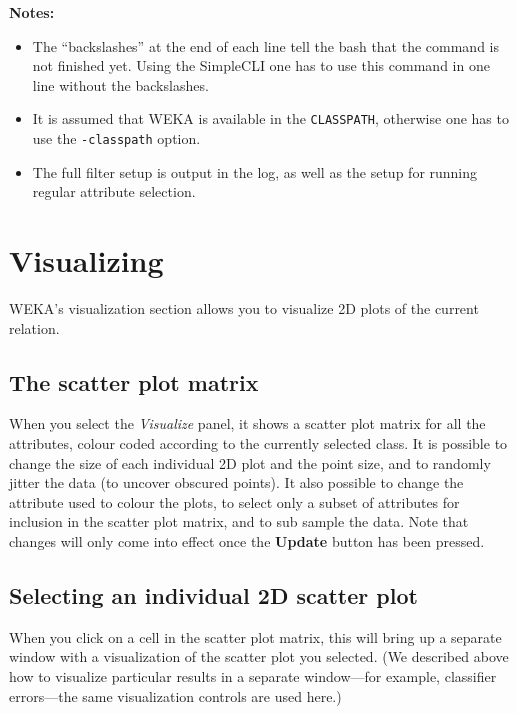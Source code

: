 \documentclass[a4paper]{article}
\begin{document}
\noindent \textbf{Notes:}
\begin{itemize}
	\item The ``backslashes'' at the end of each line tell the bash that 
	the command is not finished yet. Using the SimpleCLI one has to  
	use this command in one line without the backslashes.
	
	\item It is assumed that WEKA is available in the \texttt{CLASSPATH}, 
	otherwise one has to use the \texttt{-classpath} option.
	
	\item The full filter setup is output in the log, as well as
	the setup for running regular attribute selection.
\end{itemize}

\newpage

\section{Visualizing}

\begin{center}
\end{center}

WEKA's visualization section allows you to visualize 2D plots of the
current relation.  

\subsection{The scatter plot matrix}

When you select the {\em Visualize} panel, it shows a scatter plot
matrix for all the attributes, colour coded according to the currently
selected class. It is possible to change the size of each individual
2D plot and the point size, and to randomly jitter the data (to
uncover obscured points). It also possible to change the attribute
used to colour the plots, to select only a subset of attributes for
inclusion in the scatter plot matrix, and to sub sample the data. Note
that changes will only come into effect once the \textbf{Update}
button has been pressed.

\subsection{Selecting an individual 2D scatter plot}
 
When you click on a cell in the scatter plot matrix, this will bring
up a separate window with a visualization of the scatter plot you
selected.  (We described above how to visualize particular results in
a separate window---for example, classifier errors---the same
visualization controls are used here.)
\end{document}

